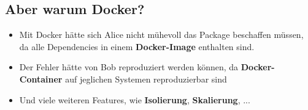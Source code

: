 \subsection{Aber warum Docker?}
\begin{frame}
    \slidehead
    \vspace{-1em}
    \Large
    \begin{itemize}[<+->]
        \item Mit Docker hätte sich Alice nicht mühevoll das Package beschaffen müssen,
              da alle Dependencies in einem \textbf{Docker-Image} enthalten sind.
        \item Der Fehler hätte von Bob reproduziert werden können, da \textbf{Docker-Container}
              auf jeglichen Systemen reproduzierbar sind
        \item Und viele weiteren Features, wie \textbf{Isolierung}, \textbf{Skalierung}, ...
    \end{itemize}

\end{frame}




